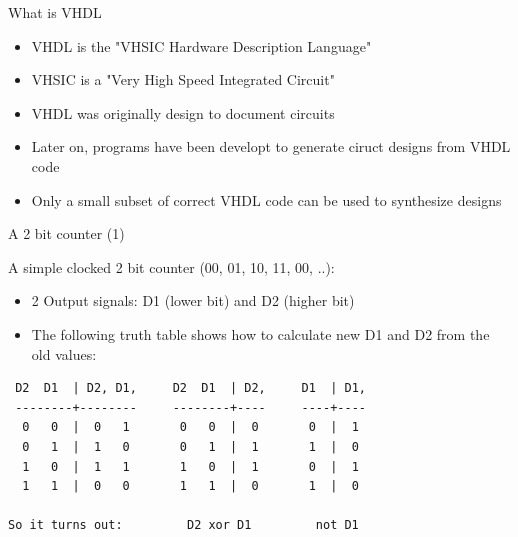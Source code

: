 \documentclass[pdf]{prosper}
\begin{document}


\begin{slide}{What is VHDL}
\begin{itemize}
\item VHDL is the "VHSIC Hardware Description Language"
\vspace*{.3cm}
\item VHSIC is a "Very High Speed Integrated Circuit"
\vspace*{.3cm}
\item VHDL was originally design to document circuits
\vspace*{.3cm}
\item Later on, programs have been developt to generate ciruct designs from VHDL code
\vspace*{.3cm}
\item Only a small subset of correct VHDL code can be used to synthesize designs
\end{itemize}
\end{slide}

\begin{slide}{A 2 bit counter (1)}

A simple clocked 2 bit counter (00, 01, 10, 11, 00, ..):
\begin{itemize}
\vspace*{.3cm}
\item 2 Output signals: D1 (lower bit) and D2 (higher bit)
\vspace*{.3cm}
\item The following truth table shows how to calculate new D1 and D2 from the old values:
\vspace*{.3cm}
\end{itemize}

\begin{verbatim}
 D2  D1  | D2, D1,     D2  D1  | D2,     D1  | D1,
 --------+--------     --------+----     ----+----
  0   0  |  0   1       0   0  |  0       0  |  1
  0   1  |  1   0       0   1  |  1       1  |  0
  1   0  |  1   1       1   0  |  1       0  |  1
  1   1  |  0   0       1   1  |  0       1  |  0

So it turns out:         D2 xor D1         not D1
\end{verbatim}

\end{slide}
\end{document}
